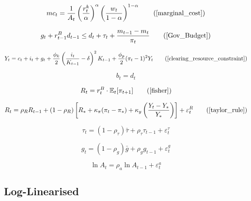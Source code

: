 \documentclass[11pt,preprint]{elsarticle}
\numberwithin{equation}{section}
\numberwithin{figure}{section}
\numberwithin{table}{section}
\begin{document}
\begin{equation}
mc_t = \frac{1}{A_t} \left( \frac{r_t^k}{\alpha} \right)^{\alpha} \left( \frac{w_t}{1-\alpha} \right)^{1-\alpha}  \tag{\ref{marginal_cost}}
\end{equation}

\begin{equation}
g_t + r^B_{t-1} d_{t-1} \leq d_t + \tau_t + \frac{m_{t-1} - m_t}{\pi_t}\tag{\ref{Gov_Budget}}
\end{equation}

\begin{equation}
   Y_t = c_t + i_t + g_t + \frac{\phi_k}{2} \left( \frac{i_t}{K_{t-1}} - \delta \right)^2 K_{t-1} + \frac{\phi_p}{2} (\pi_t - 1)^2 Y_t
   \tag{\ref{clearing_resource_constraint}}
\end{equation}

\begin{equation}
b_t = d_t
\label{Bond_market_clear}
\end{equation}

\begin{equation}
R_t = r^B_t \cdot \mathbb{E}_t[\pi_{t+1}] 
\tag{\ref{fisher}}
\end{equation}

\begin{equation}
R_t = \rho_R R_{t-1} + (1 - \rho_R) \left[ R_* + \kappa_\pi (\pi_t - \pi_*) + \kappa_y \left( \frac{Y_t - Y_*}{Y_*} \right) \right] + \varepsilon_t^R
\tag{\ref{taylor_rule}}
\end{equation}

\begin{equation}
\tau_t = (1-\rho_\tau)\bar{\tau} + \rho_\tau \tau_{t-1} + \varepsilon_t^\tau 
\label{real_taxes}
\end{equation}

\begin{equation}
g_t = (1-\rho_g)\bar{g} + \rho_g g_{t-1} + \varepsilon_t^g 
\label{gov_spending}
\end{equation}

\begin{equation}
\ln A_t = \rho_a \ln A_{t-1} + \varepsilon_t^a 
\label{technology_process}
\end{equation} \endgroup

\subsection{\texorpdfstring{Log-Linearised
\label{linear}}{Log-Linearised }}\label{log-linearised}
\end{document}
